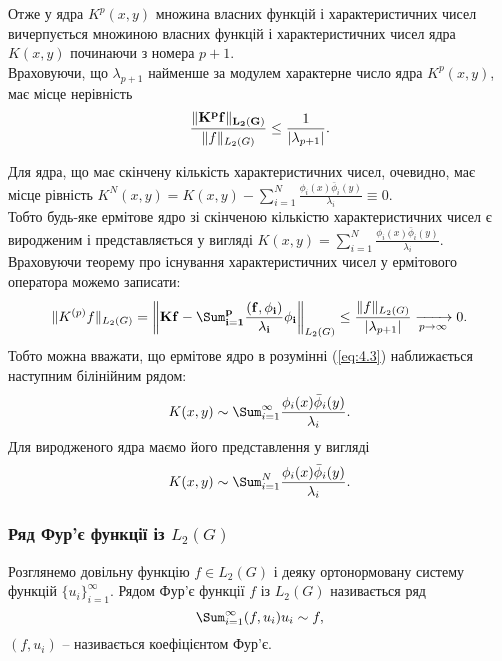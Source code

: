 Отже у ядра $K^p(x, y)$ множина власних функцій і характеристичних чисел вичерпується множиною власних функцій і характеристичних чисел ядра $K(x, y)$ починаючи з номера $p + 1$. \\

Враховуючи, що $\lambda_{p + 1}$ найменше за модулем характерне число ядра $K^p(x, y)$, має місце нерівність \[ \dfrac{\|\bf{K}^p f\|_{L_2(G)}}{\|f\|_{L_2(G)}} \le \dfrac{1}{|\lambda_{p + 1}|}. \]

Для ядра, що має скінчену кількість характеристичних чисел, очевидно, має місце рівність $K^N(x, y) = K(x, y) - \sum_{i = 1}^N \frac{\phi_i(x) \bar \phi_i(y)}{\lambda_i} \equiv 0$. \\

Тобто будь-яке ермітове ядро зі скінченою кількістю характеристичних чисел є виродженим і представляється у вигляді $K(x, y) = \sum_{i = 1}^N \frac{\phi_i(x) \bar \phi_i(y)}{\lambda_i}$. \\

Враховуючи теорему про існування характеристичних чисел у ермітового оператора можемо записати:
\begin{equation}
	\label{eq:4.3}
	\| K^{(p)} f \|_{L_2(G)} = \left\| \bf{K}f - \Sum_{i = 1}^p \dfrac{(f, \phi_i)}{\lambda_i} \phi_i \right\|_{L_2(G)} \le \dfrac{\|f\|_{L_2(G)}}{|\lambda_{p + 1}|} \xrightarrow[p\to\infty]{} 0.
\end{equation}
Тобто можна вважати, що ермітове ядро в розумінні (\ref{eq:4.3}) наближається наступним білінійним рядом:
\begin{equation}
	\label{eq:4.4}
	K(x, y) \sim \Sum_{i = 1}^\infty \dfrac{\phi_i(x) \bar \phi_i(y)}{\lambda_i}.
\end{equation}
Для виродженого ядра маємо його представлення у вигляді
\begin{equation}
	\label{eq:4.5}
	K(x, y) \sim \Sum_{i = 1}^N \dfrac{\phi_i(x) \bar \phi_i(y)}{\lambda_i}.
\end{equation}

\subsubsection{Ряд Фур'є функції із $L_2(G)$}

Розглянемо довільну функцію $f \in L_2(G)$ і деяку ортонормовану систему функцій $\{ u_i \}_{i = 1}^\infty$. Рядом Фур'є функції $f$ із $L_2(G)$ називається ряд
\begin{equation}
	\label{eq:4.6}
	\Sum_{i = 1}^\infty (f, u_i) u_i \sim f,
\end{equation}
$(f, u_i)$ -- називається коефіцієнтом Фур'є. \\

